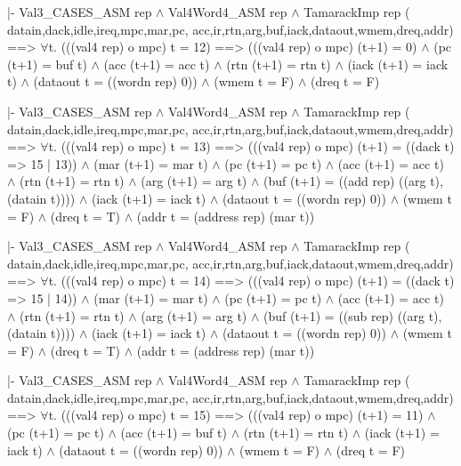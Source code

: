 \begintt
|- Val3_CASES_ASM rep \(\wedge\)
   Val4Word4_ASM rep \(\wedge\)
   TamarackImp rep (
     datain,dack,idle,ireq,mpc,mar,pc,
     acc,ir,rtn,arg,buf,iack,dataout,wmem,dreq,addr)
   ==>
   \(\forall\)t.
    (((val4 rep) o mpc) t = 12)
    ==>
    (((val4 rep) o mpc) (t+1) = 0) \(\wedge\)
    (pc (t+1) = buf t) \(\wedge\)
    (acc (t+1) = acc t) \(\wedge\)
    (rtn (t+1) = rtn t) \(\wedge\)
    (iack (t+1) = iack t) \(\wedge\)
    (dataout t = ((wordn rep) 0)) \(\wedge\)
    (wmem t = F) \(\wedge\)
    (dreq t = F)
\endtt

\begintt
|- Val3_CASES_ASM rep \(\wedge\)
   Val4Word4_ASM rep \(\wedge\)
   TamarackImp rep (
     datain,dack,idle,ireq,mpc,mar,pc,
     acc,ir,rtn,arg,buf,iack,dataout,wmem,dreq,addr)
   ==>
   \(\forall\)t.
    (((val4 rep) o mpc) t = 13)
    ==>
    (((val4 rep) o mpc) (t+1) = ((dack t) => 15 | 13)) \(\wedge\)
    (mar (t+1) = mar t) \(\wedge\)
    (pc (t+1) = pc t) \(\wedge\)
    (acc (t+1) = acc t) \(\wedge\)
    (rtn (t+1) = rtn t) \(\wedge\)
    (arg (t+1) = arg t) \(\wedge\)
    (buf (t+1) = ((add rep) ((arg t),(datain t)))) \(\wedge\)
    (iack (t+1) = iack t) \(\wedge\)
    (dataout t = ((wordn rep) 0)) \(\wedge\)
    (wmem t = F) \(\wedge\)
    (dreq t = T) \(\wedge\)
    (addr t = (address rep) (mar t))
\endtt
\newpage %

\begintt
|- Val3_CASES_ASM rep \(\wedge\)
   Val4Word4_ASM rep \(\wedge\)
   TamarackImp rep (
     datain,dack,idle,ireq,mpc,mar,pc,
     acc,ir,rtn,arg,buf,iack,dataout,wmem,dreq,addr)
   ==>
   \(\forall\)t.
    (((val4 rep) o mpc) t = 14)
    ==>
    (((val4 rep) o mpc) (t+1) = ((dack t) => 15 | 14)) \(\wedge\)
    (mar (t+1) = mar t) \(\wedge\)
    (pc (t+1) = pc t) \(\wedge\)
    (acc (t+1) = acc t) \(\wedge\)
    (rtn (t+1) = rtn t) \(\wedge\)
    (arg (t+1) = arg t) \(\wedge\)
    (buf (t+1) = ((sub rep) ((arg t),(datain t)))) \(\wedge\)
    (iack (t+1) = iack t) \(\wedge\)
    (dataout t = ((wordn rep) 0)) \(\wedge\)
    (wmem t = F) \(\wedge\)
    (dreq t = T) \(\wedge\)
    (addr t = (address rep) (mar t))
\endtt

\begintt
|- Val3_CASES_ASM rep \(\wedge\)
   Val4Word4_ASM rep \(\wedge\)
   TamarackImp rep (
     datain,dack,idle,ireq,mpc,mar,pc,
     acc,ir,rtn,arg,buf,iack,dataout,wmem,dreq,addr)
   ==>
   \(\forall\)t.
    (((val4 rep) o mpc) t = 15)
    ==>
    (((val4 rep) o mpc) (t+1) = 11) \(\wedge\)
    (pc (t+1) = pc t) \(\wedge\)
    (acc (t+1) = buf t) \(\wedge\)
    (rtn (t+1) = rtn t) \(\wedge\)
    (iack (t+1) = iack t) \(\wedge\)
    (dataout t = ((wordn rep) 0)) \(\wedge\)
    (wmem t = F) \(\wedge\)
    (dreq t = F)
\endtt

